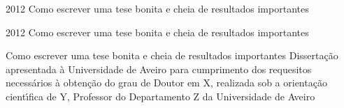 \documentclass[11pt,twoside,a4paper]{report}
\def\ThesisYear{2012}
\begin{document}
%
%

\TitlePage
         {\ThesisYear}
        {Como escrever uma tese bonita e cheia de resultados importantes}
\EndTitlePage
\titlepage\ \endtitlepage %

\TitlePage
         {\ThesisYear}
        {Como escrever uma tese bonita e cheia de resultados importantes}
\EndTitlePage
\titlepage\ \endtitlepage %


%
%

\TitlePage
  \HEADER{}{\ThesisYear}
        {Como escrever uma tese bonita e cheia de resultados importantes}
  \vspace*{15mm}
  \TEXT{}
       {Disserta\c c\~ao apresentada \`a Universidade de Aveiro para cumprimento dos requesitos
        necess\'arios \`a obten\c c\~ao do grau de Doutor em X, realizada sob a orienta\c c\~ao
        cient\'\i fica de Y, Professor do Departamento Z da Universidade de Aveiro}
\EndTitlePage
\titlepage\ \endtitlepage %
\end{document}
